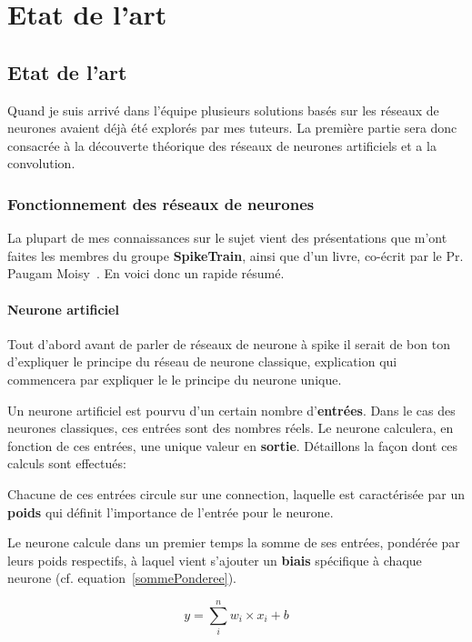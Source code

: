 
\hypertarget{Etat de l'art}{%
\chapter{Etat de l'art}\label{Etat de l'art}}
\section{Etat de l'art}
\label{Etat de l'art}

Quand je suis arrivé dans l'équipe plusieurs solutions basés sur les réseaux de neurones avaient déjà été explorés par mes tuteurs.
La première partie sera donc consacrée à la découverte théorique des réseaux de neurones artificiels et a la convolution.

\subsection{Fonctionnement des réseaux de neurones}
La plupart de mes connaissances sur le sujet vient des présentations que m'ont faites les membres du groupe \textbf{SpikeTrain}, ainsi que d'un livre, co-écrit par le Pr. Paugam Moisy~\cite{naturalHandbook}.
En voici donc un rapide résumé.

\subsubsection{Neurone artificiel}
\label{neuroneClassique}
Tout d'abord avant de parler de réseaux de neurone à spike il serait de bon ton d'expliquer le principe du réseau de neurone classique, explication qui commencera par expliquer le
le principe du neurone unique.

Un neurone artificiel est pourvu d'un certain nombre d'\textbf{entrées}. Dans le cas des neurones classiques, ces entrées sont des nombres réels. Le neurone calculera, en fonction de ces entrées, une unique valeur en \textbf{sortie}.
Détaillons la façon dont ces calculs sont effectués:

Chacune de ces entrées circule sur une connection, laquelle est caractérisée par un \textbf{poids} qui définit l'importance de l'entrée pour le neurone.

Le neurone calcule dans un premier temps la somme de ses entrées, pondérée par leurs poids respectifs, à laquel vient s'ajouter un \textbf{biais} spécifique à chaque neurone (cf. equation~\ref{sommePonderee}).

\begin{equation}
\label{sommePonderee}
y = \sum_{i}^{n} w_i \times x_i + b
\end{equation}

